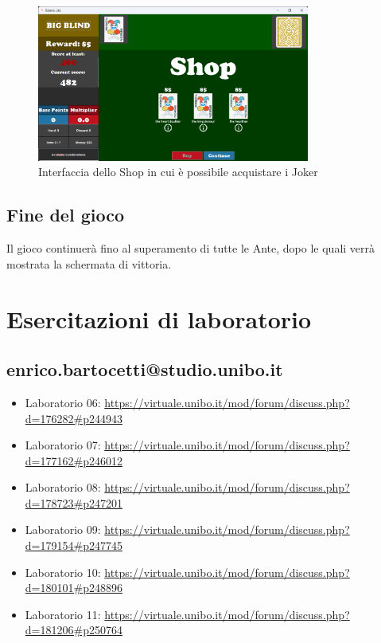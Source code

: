 \documentclass[a4paper,12pt]{report}
\begin{document}
\begin{figure}[H]
	\centering{}
	\includegraphics[width=0.8\textwidth]{img/guida/08-Shop}
	\caption{Interfaccia dello Shop in cui è possibile acquistare i Joker}
	\label{img:guida:shop}
\end{figure}

\section{Fine del gioco}

Il gioco continuerà fino al superamento di tutte le Ante, dopo le quali verrà mostrata la schermata di vittoria.


\chapter{Esercitazioni di laboratorio}

\section{enrico.bartocetti@studio.unibo.it}

\begin{itemize}
	 \item Laboratorio 06: \url{https://virtuale.unibo.it/mod/forum/discuss.php?d=176282#p244943}
	 \item Laboratorio 07: \url{https://virtuale.unibo.it/mod/forum/discuss.php?d=177162#p246012}
	 \item Laboratorio 08: \url{https://virtuale.unibo.it/mod/forum/discuss.php?d=178723#p247201}
	 \item Laboratorio 09: \url{https://virtuale.unibo.it/mod/forum/discuss.php?d=179154#p247745}
	 \item Laboratorio 10: \url{https://virtuale.unibo.it/mod/forum/discuss.php?d=180101#p248896}
	 \item Laboratorio 11: \url{https://virtuale.unibo.it/mod/forum/discuss.php?d=181206#p250764}
\end{itemize}
\end{document}
